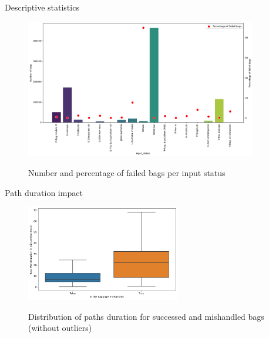 \documentclass{beamer}
\begin{document}
\begin{frame}{Descriptive statistics} 
    \begin{figure}[h]
        \centering
        \includegraphics[width=0.9\textwidth]{failed bags per input status.png}\\
        \caption{Number and percentage of failed bags per input status}
        \label{fig:Number and percentage of failed bags per input status}
    \end{figure}
\end{frame}



\begin{frame}{Path duration impact}
    \begin{figure}[h]
        \centering
        \includegraphics[width=0.6\textwidth]{Boxplot path duration per failed status.png}\\
        \caption{Distribution of paths duration for successed and mishandled bags (without outliers)}
        \label{fig:Distribution of paths duration for non-failed and failed bags}
    \end{figure}
\end{frame}
\end{document}
